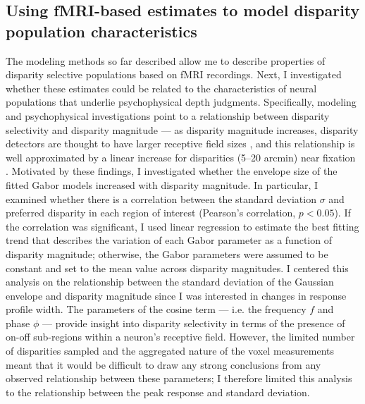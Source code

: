 \subsection{Using fMRI-based estimates to model disparity population characteristics}
The modeling methods so far described allow me to describe properties of disparity selective populations based on fMRI recordings. Next, I investigated whether these estimates could be related to the characteristics of neural populations that underlie psychophysical depth judgments. Specifically, modeling and psychophysical investigations point to a relationship between disparity selectivity and disparity magnitude --- as disparity magnitude increases, disparity detectors are thought to have larger receptive field sizes \cite{Lehky:1990fk,Stevenson:1992kx}, and this relationship is well approximated by a linear increase for disparities (5--20 arcmin) near fixation \cite{Stevenson:1992kx}. Motivated by these findings, I investigated whether the envelope size of the fitted Gabor models increased with disparity magnitude. In particular, I examined whether there is a correlation between the standard deviation $\sigma$ and preferred disparity in each region of interest (Pearson's correlation, $p<0.05$). If the correlation was significant, I used linear regression to estimate the best fitting trend that describes the variation of each Gabor parameter as a function of disparity magnitude; otherwise, the Gabor parameters were assumed to be constant and set to the mean value across disparity magnitudes. 
I centered this analysis on the relationship between the standard deviation of the Gaussian envelope and disparity magnitude since I was interested in changes in response profile width. The parameters of the cosine term --- i.e. the frequency $f$ and phase $\phi$ --- provide insight into disparity selectivity in terms of the presence of on-off sub-regions within a neuron's receptive field. However, the limited number of disparities sampled and the aggregated nature of the voxel measurements meant that it would be difficult to draw any strong conclusions from any observed relationship between these parameters; I therefore limited this analysis to the relationship between the peak response and standard deviation.

